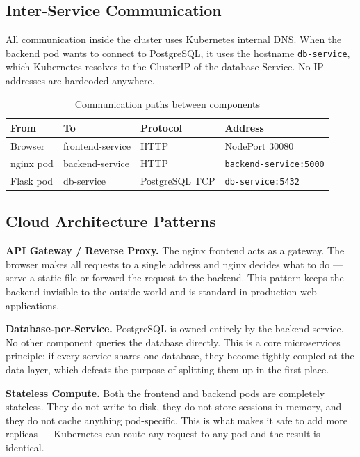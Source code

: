 \documentclass[12pt,a4paper]{article}
\begin{document}
\subsection{Inter-Service Communication}

All communication inside the cluster uses Kubernetes internal DNS. When the backend pod wants to connect to PostgreSQL, it uses the hostname \texttt{db-service}, which Kubernetes resolves to the ClusterIP of the database Service. No IP addresses are hardcoded anywhere.

\begin{table}[h]
\centering
\begin{tabular}{@{}llll@{}}
\toprule
\textbf{From} & \textbf{To} & \textbf{Protocol} & \textbf{Address} \\
\midrule
Browser      & frontend-service & HTTP            & NodePort 30080 \\
nginx pod    & backend-service  & HTTP            & \texttt{backend-service:5000} \\
Flask pod    & db-service       & PostgreSQL TCP  & \texttt{db-service:5432} \\
\bottomrule
\end{tabular}
\caption{Communication paths between components}
\end{table}

\subsection{Cloud Architecture Patterns}

\textbf{API Gateway / Reverse Proxy.}
The nginx frontend acts as a gateway. The browser makes all requests to a single address and nginx decides what to do --- serve a static file or forward the request to the backend. This pattern keeps the backend invisible to the outside world and is standard in production web applications.

\textbf{Database-per-Service.}
PostgreSQL is owned entirely by the backend service. No other component queries the database directly. This is a core microservices principle: if every service shares one database, they become tightly coupled at the data layer, which defeats the purpose of splitting them up in the first place.

\textbf{Stateless Compute.}
Both the frontend and backend pods are completely stateless. They do not write to disk, they do not store sessions in memory, and they do not cache anything pod-specific. This is what makes it safe to add more replicas --- Kubernetes can route any request to any pod and the result is identical.
\end{document}
